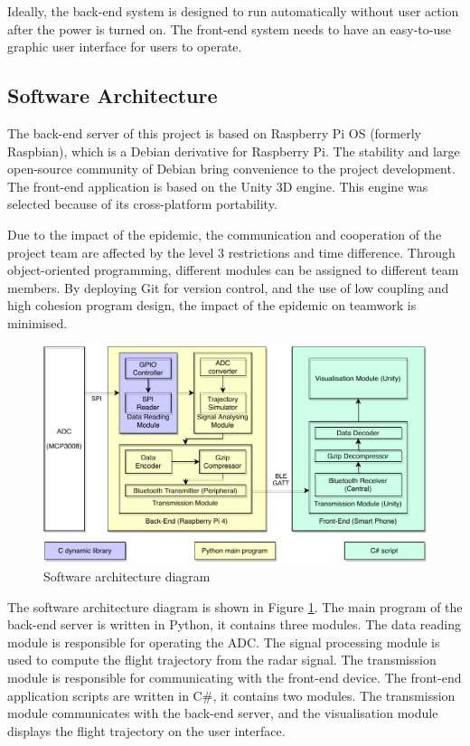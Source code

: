 Ideally, the back-end system is designed to run automatically without user action after the power is turned on. The front-end system needs to have an easy-to-use graphic user interface for users to operate.



\subsection{Software Architecture}
The back-end server of this project is based on Raspberry Pi OS (formerly Raspbian), which is a Debian derivative for Raspberry Pi. The stability and large open-source community of Debian bring convenience to the project development. The front-end application is based on the Unity 3D engine. This engine was selected because of its cross-platform portability.
\par
Due to the impact of the epidemic, the communication and cooperation of the project team are affected by the level 3 restrictions and time difference. Through object-oriented programming, different modules can be assigned to different team members. By deploying Git for version control, and the use of low coupling and high cohesion program design, the impact of the epidemic on teamwork is minimised.
\begin{figure}[H]
    \centering
    \includegraphics[width=\textwidth]{figure/Software.pdf}
    \caption{Software architecture diagram}
    \label{fig:software_diagram}
\end{figure}
The software architecture diagram is shown in Figure \ref{fig:software_diagram}. The main program of the back-end server is written in Python, it contains three modules. The data reading module is responsible for operating the ADC. The signal processing module is used to compute the flight trajectory from the radar signal. The transmission module is responsible for communicating with the front-end device. The front-end application scripts are written in C\#, it contains two modules. The transmission module communicates with the back-end server, and the visualisation module displays the flight trajectory on the user interface.


